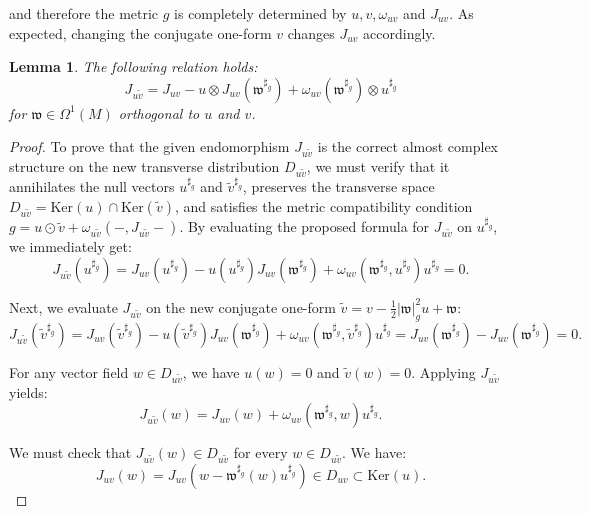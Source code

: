 \documentclass[10pt,a4paper,twoside,reqno]{amsart}
\theoremstyle{plain}
\newtheorem{lemma}[thm]{Lemma}
\theoremstyle{definition}
\theoremstyle{remark}
\renewcommand{\ker}{\mathrm{Ker}}
\begin{document}
\noindent
and therefore the metric $g$ is completely determined by $u, v, \omega_{uv}$ and $J_{uv}$. As expected, changing the conjugate one-form $v$ changes $J_{uv}$ accordingly.
\begin{lemma} 
The following relation holds:
\begin{equation*}
J_{u\tilde{v}} =J_{uv} -u\otimes J_{uv}(\mathfrak{w}^{\sharp_g}) + \omega_{uv}(\mathfrak{w}^{\sharp_g})\otimes u^{\sharp_g}
\end{equation*}
for $\mathfrak{w}\in\Omega^1(M)$ orthogonal to $u$ and $v$. 
\end{lemma}

\begin{proof}
To prove that the given endomorphism $J_{u\tilde{v}}$ is the correct almost complex structure on the new transverse distribution $D_{u\tilde{v}}$, we must verify that it annihilates the null vectors $u^{\sharp_g}$ and $\tilde{v}^{\sharp_g}$, preserves the transverse space $D_{u\tilde{v}} = \ker(u) \cap \ker(\tilde{v})$, and satisfies the metric compatibility condition $g = u \odot \tilde{v} + \omega_{u\tilde{v}}( - , J_{u\tilde{v}} - )$. By evaluating the proposed formula for $J_{u\tilde{v}}$ on $u^{\sharp_g}$, we immediately get:
\begin{equation*}
J_{u\tilde{v}}(u^{\sharp_g}) = J_{uv}(u^{\sharp_g}) - u(u^{\sharp_g})J_{uv}(\mathfrak{w}^{\sharp_g}) + \omega_{uv}(\mathfrak{w}^{\sharp_g}, u^{\sharp_g}) u^{\sharp_g} = 0.
\end{equation*} 

\noindent
Next, we evaluate $J_{u\tilde{v}}$ on the new conjugate one-form $\tilde{v} = v - \frac{1}{2}\vert\mathfrak{w}\vert_g^2 u + \mathfrak{w}$:
\begin{equation*}
J_{u\tilde{v}}(\tilde{v}^{\sharp_g}) = J_{uv}(\tilde{v}^{\sharp_g}) - u(\tilde{v}^{\sharp_g})J_{uv}(\mathfrak{w}^{\sharp_g}) + \omega_{uv}(\mathfrak{w}^{\sharp_g}, \tilde{v}^{\sharp_g}) u^{\sharp_g}   = J_{uv}(\mathfrak{w}^{\sharp_g}) - J_{uv}(\mathfrak{w}^{\sharp_g}) = 0.
\end{equation*}

\noindent
For any vector field $w \in D_{u\tilde{v}}$, we have $u(w) = 0$ and $\tilde{v}(w) = 0$. Applying $J_{u\tilde{v}}$ yields:
\begin{equation*}
J_{u\tilde{v}}(w) = J_{uv}(w) + \omega_{uv}(\mathfrak{w}^{\sharp_g}, w) u^{\sharp_g}.
\end{equation*}

\noindent
We must check that $J_{u\tilde{v}}(w) \in D_{u\tilde{v}}$ for every $w\in D_{u\tilde{v}}$. We have:
\begin{equation*}
J_{uv}(w) =  J_{uv}(w - \mathfrak{w}^{\sharp_g}(w) u^{\sharp_g})  \in D_{uv} \subset \ker(u).
\end{equation*}


\end{proof}
\end{document}
